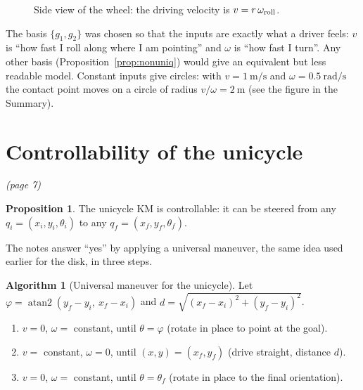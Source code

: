 \documentclass[11pt,a4paper]{article}
\theoremstyle{definition}
\newtheorem{proposition}[theorem]{Proposition}
\newtheorem{algorithm}[theorem]{Algorithm}
\begin{document}
\begin{figure}[h]
\centering
{}
\caption{Side view of the wheel: the driving velocity is $v=r\,\omega_{\rm roll}$.}\label{fig:wheel}
\end{figure}

\begin{intuition}
The basis $\{g_1,g_2\}$ was chosen so that the inputs are exactly what a driver feels: $v$ is ``how fast I roll along where I am pointing'' and $\omega$ is ``how fast I turn''. Any other basis (Proposition~\ref{prop:nonuniq}) would give an equivalent but less readable model. Constant inputs give circles: with $v=1\ \mathrm{m/s}$ and $\omega=0.5\ \mathrm{rad/s}$ the contact point moves on a circle of radius $v/\omega=2\ \mathrm m$ (see the figure in the Summary).
\end{intuition}

\section{Controllability of the unicycle}\emph{(page 7)}

\begin{proposition}\label{prop:unicycle-ctrl}
The unicycle KM is controllable: it can be steered from any $q_i=(x_i,y_i,\theta_i)$ to any $q_f=(x_f,y_f,\theta_f)$.
\end{proposition}

The notes answer ``yes'' by applying a universal maneuver, the same idea used earlier for the disk, in three steps.

\begin{algorithm}[Universal maneuver for the unicycle]\label{alg:maneuver}
Let $\varphi=\operatorname{atan2}(y_f-y_i,\ x_f-x_i)$ and $d=\sqrt{(x_f-x_i)^2+(y_f-y_i)^2}$.
\begin{enumerate}[nosep]
\item $v=0$, $\omega=$ constant, until $\theta=\varphi$ (rotate in place to point at the goal).
\item $v=$ constant, $\omega=0$, until $(x,y)=(x_f,y_f)$ (drive straight, distance $d$).
\item $v=0$, $\omega=$ constant, until $\theta=\theta_f$ (rotate in place to the final orientation).
\end{enumerate}
\end{algorithm}
\end{document}
